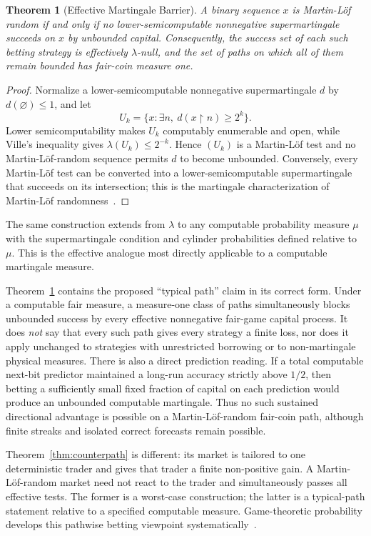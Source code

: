 \documentclass[aps,pra,reprint,superscriptaddress,amsmath,amssymb,floatfix]{revtex4-2}
\theoremstyle{plain}
\newtheorem{theorem}{Theorem}
\theoremstyle{definition}
\theoremstyle{remark}
\begin{document}
\begin{theorem}[Effective Martingale Barrier]
  \label{thm:effective}
  A binary sequence \(x\) is Martin-L\"of random if and only if no
  lower-semicomputable nonnegative supermartingale succeeds on \(x\) by
  unbounded capital. Consequently, the success set of each such betting
  strategy is effectively \(\lambda\)-null, and the set of paths on which all
  of them remain bounded has fair-coin measure one.
\end{theorem}

\begin{proof}
Normalize a lower-semicomputable nonnegative supermartingale \(d\) by
\(d(\varnothing)\leq1\), and let
\[
  U_k=\{x:\exists n,\ d(x{\upharpoonright}n)\geq2^k\}.
\]
Lower semicomputability makes \(U_k\) computably enumerable and open, while
Ville's inequality gives \(\lambda(U_k)\leq2^{-k}\). Hence
\((U_k)\) is a Martin-L\"of test and no Martin-L\"of-random sequence permits
\(d\) to become unbounded. Conversely, every Martin-L\"of test can be converted
into a lower-semicomputable supermartingale that succeeds on its intersection;
this is the martingale characterization of Martin-L\"of
randomness~\cite{calude:02,Nies2009}.
\end{proof}

The same construction extends from \(\lambda\) to any computable probability
measure \(\mu\) with the supermartingale condition and cylinder probabilities
defined relative to \(\mu\). This is the effective analogue most directly
applicable to a computable martingale measure.

Theorem~\ref{thm:effective} contains the proposed ``typical path'' claim in its
correct form. Under a computable fair measure, a measure-one class of paths
simultaneously blocks unbounded success by every effective nonnegative
fair-game capital process. It does \emph{not} say that every such path gives
every strategy a finite loss, nor does it apply unchanged to strategies with
unrestricted borrowing or to non-martingale physical measures.
There is also a direct prediction reading. If a total computable next-bit
predictor maintained a long-run accuracy strictly above \(1/2\), then betting
a sufficiently small fixed fraction of capital on each prediction would
produce an unbounded computable martingale. Thus no such sustained directional
advantage is possible on a Martin-L\"of-random fair-coin path, although finite
streaks and isolated correct forecasts remain possible.

Theorem~\ref{thm:counterpath} is different: its market is tailored to one
deterministic trader and gives that trader a finite non-positive gain. A
Martin-L\"of-random market need not react to the trader and simultaneously
passes all effective tests. The former is a worst-case construction; the
latter is a typical-path statement relative to a specified computable
measure. Game-theoretic probability develops this pathwise betting viewpoint
systematically~\cite{ShaferVovk2001}.
\end{document}
